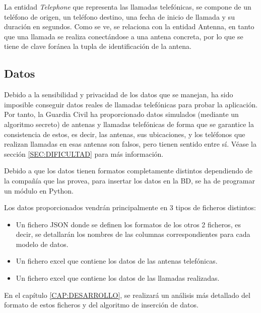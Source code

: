     La entidad \textit{Telephone} que representa las llamadas telefónicas, se compone de un teléfono de origen, un teléfono destino, una fecha de inicio de llamada y su duración en segundos. Como se ve, se relaciona con la entidad Antenna, en tanto que una llamada se realiza conectándose a una antena concreta, por lo que se tiene de clave foránea la tupla de identificación de la antena.
       
       
  \subsection{Datos}
    Debido a la sensibilidad y privacidad de los datos que se manejan, ha sido imposible conseguir datos reales de llamadas telefónicas para probar la aplicación. Por tanto, la Guardia Civil ha proporcionado datos simulados (mediante un algoritmo secreto) de antenas y llamadas telefónicas de forma que se garantice la consistencia de estos, es decir, las antenas, sus ubicaciones, y los teléfonos que realizan llamadas en esas antenas son falsos, pero tienen sentido entre sí. Véase la sección \ref{SEC:DIFICULTAD} para más información.

    Debido a que los datos tienen formatos completamente distintos dependiendo de la compañía que las provea, para insertar los datos en la BD, se ha de programar un módulo en Python.
    
    Los datos proporcionados vendrán principalmente en 3 tipos de ficheros distintos:
    \begin{itemize}
      \item Un fichero JSON donde se definen los formatos de los otros 2 ficheros, es decir, se detallarán los nombres de las columnas correspondientes para cada modelo de datos.
      \item Un fichero excel que contiene los datos de las antenas telefónicas.
      \item Un fichero excel que contiene los datos de las llamadas realizadas.
    \end{itemize}
  
    En el capítulo \ref{CAP:DESARROLLO}, se realizará un análisis más detallado del formato de estos ficheros y del algoritmo de inserción de datos.